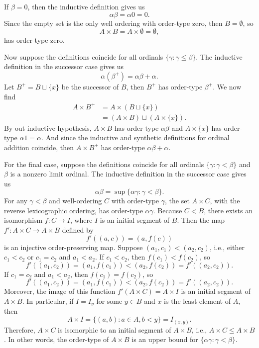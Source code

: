 \documentclass[12pt]{article}
\begin{document}
    If $\beta = 0$, then the inductive definition gives us
    \[
        \alpha\beta = \alpha0 = 0.
    \]
    Since the empty set is the only well ordering with order-type zero, then $B = \emptyset$, so
    \[
        A \times B = A \times \emptyset = \emptyset,
    \]
    has order-type zero.
    
    Now suppose the definitions coincide for all ordinals $\{\gamma : \gamma \leq \beta\}$. The inductive definition in the successor case gives us
    \[
        \alpha(\beta^+) = \alpha\beta + \alpha.
    \]
    Let $B^+ = B \sqcup \{x\}$ be the successor of $B$, then $B^+$ has order-type $\beta^+$. We now find
    \begin{align*}
        A \times B^+ 
            &= A \times (B \sqcup \{x\}) \\
            &= (A \times B) \sqcup (A \times \{x\}).
    \end{align*}
    By out inductive hypothesis, $A \times B$ has order-type $\alpha\beta$ and $A \times \{x\}$ has order-type $\alpha1 = \alpha$. And since the inductive and synthetic definitions for ordinal addition coincide, then $A \times B^+$ has order-type $\alpha\beta + \alpha$.
    
    For the final case, suppose the definitions coincide for all ordinals $\{\gamma : \gamma < \beta\}$ and $\beta$ is a nonzero limit ordinal. The inductive definition in the successor case gives us
    \[
        \alpha\beta = \sup\{\alpha\gamma : \gamma < \beta\}.
    \]
    For any $\gamma < \beta$ and well-ordering $C$ with order-type $\gamma$, the set $A \times C$, with the reverse lexicographic ordering, has order-type $\alpha\gamma$. Because $C < B$, there exists an isomorphism $f : C \to I$, where $I$ is an initial segment of $B$. Then the map $f' : A \times C \to A \times B$ defined by
    \[
        f'((a, c)) = (a, f(c))
    \]
    is an injective order-preserving map. Suppose $(a_1, c_1) < (a_2, c_2)$, i.e., either $c_1 < c_2$ or $c_1 = c_2$ and $a_1 < a_2$. If $c_1 < c_2$, then $f(c_1) < f(c_2)$, so
    \[
        f'((a_1, c_2)) = (a_1, f(c_1)) < (a_2, f(c_2)) = f'((a_2, c_2)).
    \]
    If $c_1 = c_2$ and $a_1 < a_2$, then $f(c_1) = f(c_2)$, so
    \[
        f'((a_1, c_2)) = (a_1, f(c_1)) < (a_2, f(c_2)) = f'((a_2, c_2)).
    \]
    Moreover, the image of this function $f'(A \times C) = A \times I$ is an initial segment of $A \times B$. In particular, if $I = I_y$ for some $y \in B$ and $x$ is the least element of $A$, then
    \[
        A \times I = \{(a, b) : a \in A, b < y\} = I_{(x,y)}.
    \]
    Therefore, $A \times C$ is isomorphic to an initial segment of $A \times B$, i.e., $A \times C \leq A \times B$. In other words, the order-type of $A \times B$ is an upper bound for $\{\alpha\gamma : \gamma < \beta\}$. 
\end{document}
